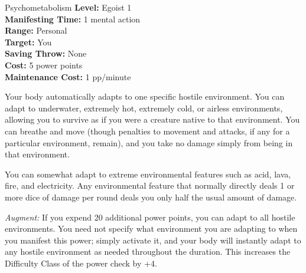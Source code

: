 {Psychometabolism}
{
	\textbf{Level:}
	Egoist 1\\
	\textbf{Manifesting Time:}
	1 mental action\\
	\textbf{Range:}
	Personal\\
	\textbf{Target:}
	You\\
	\textbf{Saving Throw:}
	None\\
	\textbf{Cost:}
	5 power points\\
	\textbf{Maintenance Cost:}
	1 pp/minute\\
}
{
	Your body automatically adapts to one specific hostile environment. You can adapt to underwater, extremely hot, extremely cold, or airless environments, allowing you to survive as if you were a creature native to that environment. You can breathe and move (though penalties to movement and attacks, if any for a particular environment, remain), and you take no damage simply from being in that environment.

	You can somewhat adapt to extreme environmental features such as acid, lava, fire, and electricity. Any environmental feature that normally directly deals 1 or more dice of damage per round deals you only half the usual amount of damage.

	\textit{Augment:} If you expend 20 additional power points, you can adapt to all hostile environments. You need not specify what environment you are adapting to when you manifest this power; simply activate it, and your body will instantly adapt to any hostile environment as needed throughout the duration. This increases the Difficulty Class of the power check by +4.
}